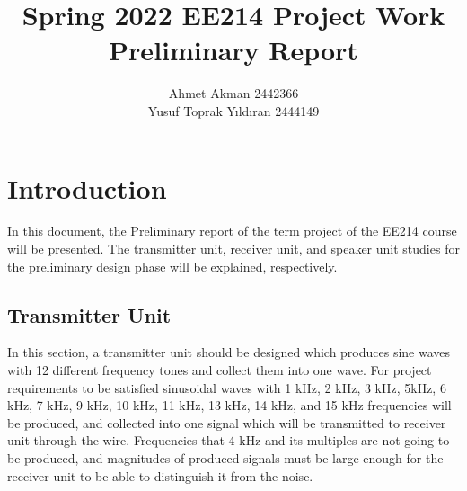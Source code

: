 \documentclass[letterpaper,12pt]{article}
\begin{document}
\thispagestyle{empty}

\title{ \vspace{-2cm} Spring 2022 EE214 Project Work  \protect\\ Preliminary Report\vspace{-4mm}}
\author{ Ahmet Akman 2442366 \protect\\ Yusuf Toprak Yıldıran 2444149 }
\date{}
\maketitle
\vspace{-1.5cm}
\section{Introduction}
\vspace{-4mm}
In this document, the Preliminary report of the term project of the EE214 course will be presented. The transmitter unit, receiver unit, and speaker unit studies for the preliminary design phase will be explained, respectively.
\vspace{-4mm}
\subsection{Transmitter Unit}
In this section, a transmitter unit should be designed which produces sine waves with 12 different frequency tones and collect them into one wave. For project requirements to be satisfied sinusoidal waves with 1 kHz, 2 kHz, 3 kHz, 5kHz, 6 kHz, 7 kHz, 9 kHz, 10 kHz, 11 kHz, 13 kHz, 14 kHz, and 15 kHz frequencies will be produced, and collected into one signal which will be transmitted to receiver unit through the wire. Frequencies that 4 kHz and its multiples are not going to be produced, and magnitudes of produced signals must be large enough for the receiver unit to be able to distinguish it from the noise.
\end{document}
